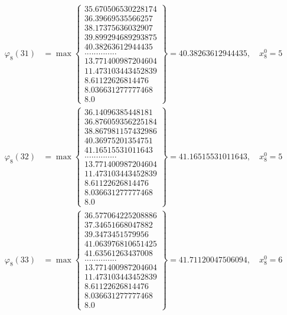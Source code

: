 \documentclass{article}
\begin{document}
\begin{align*}
  
  
  
\varphi_{8}(31) &= \max \left\{ \begin{array}{c}
35.670506530228174 \\
 36.39669535566257 \\
 38.17375636032907 \\
 39.899294689293875 \\
 40.38263612944435 \\
 .............. \\
 13.771400987204604 \\
 11.473103443452839 \\
 8.61122626814476 \\
 8.036631277777468 \\
 8.0
\end{array} \right\} = 40.38263612944435, \quad x_{8}^0 = 5\\
  
  
  
  
\varphi_{8}(32) &= \max \left\{ \begin{array}{c}
36.14096385448181 \\
 36.876059356225184 \\
 38.867981157432986 \\
 40.36975201354751 \\
 41.16515531011643 \\
 .............. \\
 13.771400987204604 \\
 11.473103443452839 \\
 8.61122626814476 \\
 8.036631277777468 \\
 8.0
\end{array} \right\} = 41.16515531011643, \quad x_{8}^0 = 5\\
  
  
  
  
\varphi_{8}(33) &= \max \left\{ \begin{array}{c}
36.577064225208886 \\
 37.34651668047882 \\
 39.3473451579956 \\
 41.063976810651425 \\
 41.63561263437008 \\
 .............. \\
 13.771400987204604 \\
 11.473103443452839 \\
 8.61122626814476 \\
 8.036631277777468 \\
 8.0
\end{array} \right\} = 41.71120047506094, \quad x_{8}^0 = 6\\
  

\end{align*}
\end{document}
